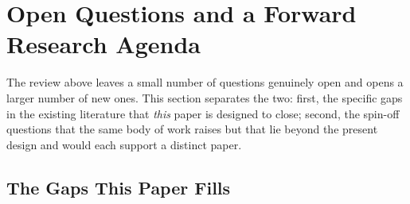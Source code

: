 \section{Open Questions and a Forward Research Agenda}
\label{sec:agenda}

The review above leaves a small number of questions genuinely open and opens a larger
number of new ones. This section separates the two: first, the specific gaps in the
existing literature that \emph{this} paper is designed to close; second, the spin-off
questions that the same body of work raises but that lie beyond the present design and
would each support a distinct paper.

\subsection{The Gaps This Paper Fills}
\label{subsec:gaps_filled}


